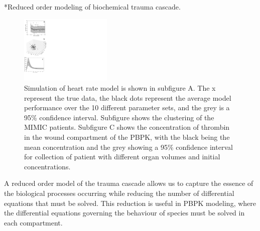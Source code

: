 \documentclass[11pt]{article}
\makeatletter
\renewcommand\paragraph{\@startsection
  {paragraph}{2}{0mm}
  {-0.05in}
  {-0.5\baselineskip}
  {\normalfont\normalsize\itshape}}
\makeatother
\begin{document}
\paragraph*{Reduced order modeling of biochemical trauma cascade.}
\begin{figure}
  \includegraphics[width=0.39\textwidth,trim={0cm 2cm 20.2cm 0},clip]{./figures/colfigure.pdf}
  \caption{Simulation of heart rate model is shown in subfigure A. The x represent the true data, the black dots represent the average model performance over the 10 different parameter sets, and the grey is a 95\% confidence interval. Subfigure shows the clustering of the MIMIC patients. Subfigure C shows the concentration of thrombin in the wound compartment of the PBPK, with the black being the mean concentration and the grey showing a 95\% confidence interval for collection of patient with different organ volumes and initial concentrations.}\label{fig:mulitobjperformance}
\end{figure}
A reduced order model of the trauma cascade allows us to capture the essence of the biological processes occurring while reducing the number of differential equations that must be solved. This reduction is useful in PBPK modeling, where the differential equations governing the behaviour of species must be solved in each compartment. 
\end{document}
